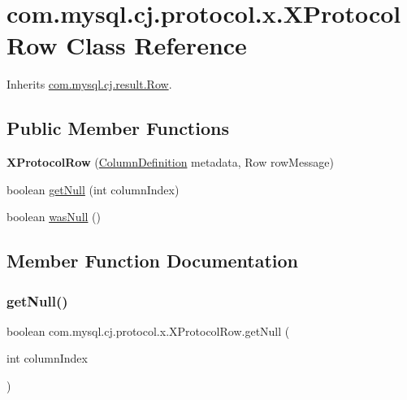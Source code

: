 \hypertarget{classcom_1_1mysql_1_1cj_1_1protocol_1_1x_1_1_x_protocol_row}{}\section{com.\+mysql.\+cj.\+protocol.\+x.\+X\+Protocol\+Row Class Reference}
\label{classcom_1_1mysql_1_1cj_1_1protocol_1_1x_1_1_x_protocol_row}


Inherits \mbox{\hyperlink{interfacecom_1_1mysql_1_1cj_1_1result_1_1_row}{com.\+mysql.\+cj.\+result.\+Row}}.

\subsection*{Public Member Functions}
\begin{DoxyCompactItemize}
\item 
\mbox{\label{classcom_1_1mysql_1_1cj_1_1protocol_1_1x_1_1_x_protocol_row_aa76bb965d7fa7029ee045625aa64db58}} 
{\bfseries X\+Protocol\+Row} (\mbox{\hyperlink{interfacecom_1_1mysql_1_1cj_1_1protocol_1_1_column_definition}{Column\+Definition}} metadata, Row row\+Message)
\item 
boolean \mbox{\hyperlink{classcom_1_1mysql_1_1cj_1_1protocol_1_1x_1_1_x_protocol_row_adeaa06e6fee80085ce70902ed77ce16a}{get\+Null}} (int column\+Index)
\item 
boolean \mbox{\hyperlink{classcom_1_1mysql_1_1cj_1_1protocol_1_1x_1_1_x_protocol_row_ae6fd328d9a5ac92bdbb910fb9c8c043a}{was\+Null}} ()
\end{DoxyCompactItemize}


\subsection{Member Function Documentation}
\mbox{\label{classcom_1_1mysql_1_1cj_1_1protocol_1_1x_1_1_x_protocol_row_adeaa06e6fee80085ce70902ed77ce16a}} 
\subsubsection{\texorpdfstring{get\+Null()}{getNull()}}
{\footnotesize\ttfamily boolean com.\+mysql.\+cj.\+protocol.\+x.\+X\+Protocol\+Row.\+get\+Null (\begin{DoxyParamCaption}\item[{int}]{column\+Index }\end{DoxyParamCaption})}

